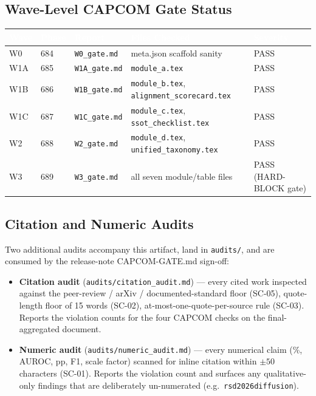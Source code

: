 \documentclass[11pt,letterpaper]{article}
\newcommand{\tableheader}[1]{\textbf{\sffamily\textcolor{white}{#1}}}
\begin{document}
\subsection{Wave-Level CAPCOM Gate Status}
\label{sec:verify-matrix:capcom}

\begin{center}
\small
\begin{tabularx}{\textwidth}{L{2.0cm}L{2.0cm}L{2.2cm}XL{1.8cm}}
\toprule
{}
\tableheader{Wave} & \tableheader{Phase} & \tableheader{Report} & \tableheader{Files Checked} & \tableheader{Severity} \\
\midrule
W0 & 684 & \texttt{W0\_gate.md} & meta.json scaffold sanity & PASS \\
W1A & 685 & \texttt{W1A\_gate.md} & \texttt{module\_a.tex} & PASS \\
W1B & 686 & \texttt{W1B\_gate.md} & \texttt{module\_b.tex}, \texttt{alignment\_scorecard.tex} & PASS \\
W1C & 687 & \texttt{W1C\_gate.md} & \texttt{module\_c.tex}, \texttt{ssot\_checklist.tex} & PASS \\
W2 & 688 & \texttt{W2\_gate.md} & \texttt{module\_d.tex}, \texttt{unified\_taxonomy.tex} & PASS \\
W3 & 689 & \texttt{W3\_gate.md} & all seven module/table files & PASS (HARD-BLOCK gate) \\
\bottomrule
\end{tabularx}
\label{tab:capcom-status}
\end{center}

\subsection{Citation and Numeric Audits}
\label{sec:verify-matrix:audits}

Two additional audits accompany this artifact, land in \texttt{audits/}, and
are consumed by the release-note CAPCOM-GATE.md sign-off:

\begin{itemize}[leftmargin=*,itemsep=0.3em]
\item \textbf{Citation audit} (\texttt{audits/citation\_audit.md}) --- every
cited work inspected against the peer-review / arXiv / documented-standard
floor (SC-05), quote-length floor of 15 words (SC-02), at-most-one-quote-per-source
rule (SC-03). Reports the violation counts for the four CAPCOM
checks on the final-aggregated document.

\item \textbf{Numeric audit} (\texttt{audits/numeric\_audit.md}) --- every
numerical claim (\%, AUROC, pp, F1, scale factor) scanned for inline citation
within $\pm 50$ characters (SC-01). Reports the violation count and surfaces
any qualitative-only findings that are deliberately un-numerated (e.g.\
\texttt{rsd2026diffusion}).
\end{itemize}
\end{document}
